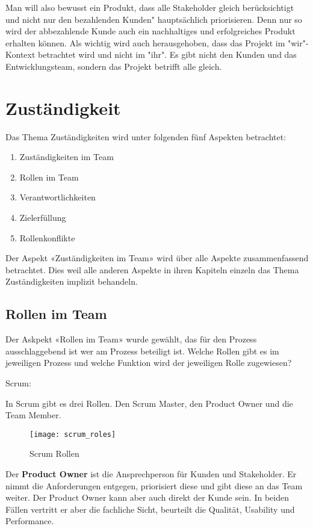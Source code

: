 Man will also bewusst ein Produkt, dass alle Stakeholder gleich berücksichtigt und nicht nur den bezahlenden Kunden" hauptsächlich priorisieren. Denn nur so wird der abbezahlende Kunde auch ein nachhaltiges und erfolgreiches Produkt erhalten können.
\medskip
Als wichtig wird auch herausgehoben, dass das Projekt im "wir"-Kontext betrachtet wird und nicht im "ihr". Es gibt nicht den Kunden und das Entwicklungsteam, sondern das Projekt betrifft alle gleich.


\section{Zuständigkeit}

Das Thema Zuständigkeiten wird unter folgenden fünf Aspekten betrachtet:
\begin{enumerate}
\item Zuständigkeiten im Team
\item Rollen im Team
\item Verantwortlichkeiten
\item Zielerfüllung
\item Rollenkonflikte
\end{enumerate}

Der Aspekt «Zuständigkeiten im Team» wird über alle Aspekte zusammenfassend betrachtet. Dies weil alle anderen Aspekte in ihren Kapiteln einzeln das Thema Zuständigkeiten implizit behandeln.

\subsection{Rollen im Team}

Der Askpekt «Rollen im Team» wurde gewählt, das für den Prozess ausschlaggebend ist wer am Prozess beteiligt ist. Welche Rollen gibt es im jeweiligen Prozess und welche Funktion wird der jeweiligen Rolle zugewiesen?

{\Large Scrum:} \medskip

In Scrum gibt es drei Rollen. Den Scrum Master, den Product Owner und die Team Member. 
\begin{figure}[H]
	\centering
	\texttt{[image: scrum\_roles]}
	\caption{Scrum Rollen}
	\label{fig:scrumrollen}
\end{figure}

Der \textbf{Product Owner} ist die Ansprechperson für Kunden und Stakeholder. Er nimmt die Anforderungen entgegen, priorisiert diese und gibt diese an das Team weiter. Der Product Owner kann aber auch direkt der Kunde sein. In beiden Fällen vertritt er aber die fachliche Sicht, beurteilt die Qualität, Usability und Performance. \medskip

